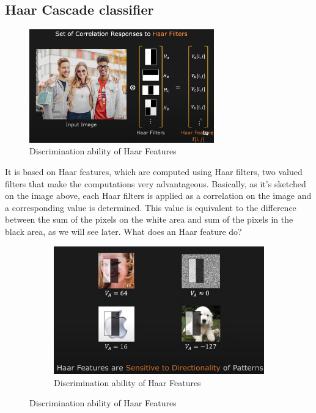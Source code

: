 \documentclass[12pt,a4paper]{article}
\begin{document}
\begin{large}
\subsection{Haar Cascade classifier}
\begin{figure} [!h]
  \centering
  \captionsetup{justification=centering}
  \includegraphics[width=8cm]{images/haar1.png}
  \caption{Discrimination ability of Haar Features}
  \end{figure}
It is based on Haar features, which are computed using Haar filters, two valued filters that make the computations very advantageous. Basically, as it's sketched on the image above, each Haar filters is applied as a correlation on the image and a corresponding value is determined. This value is equivalent to the difference between the sum of the pixels on the white area and sum of the pixels in the black area, as we will see later.
What does an Haar feature do?

\begin{figure} [!hbp]
  \centering
    \begin{subfigure}[b]{0.4\textwidth}
    \centering
    \captionsetup{justification=centering}
      \includegraphics[width=\textwidth]{images/haar2.png}
      \caption{Discrimination ability of Haar Features}
      

\end{subfigure}
\end{figure}
\end{large}
\end{document}
